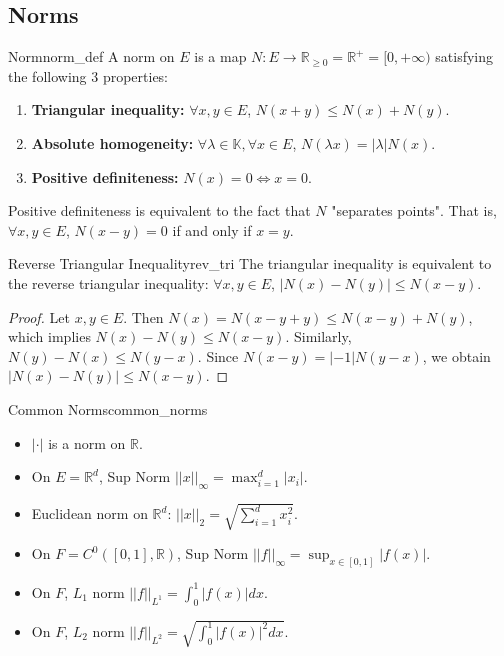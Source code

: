\documentclass[11pt, a4paper]{article}
\begin{document}
\subsection{Norms}
\begin{definition}{Norm}{norm_def}
A norm on $E$ is a map $N: E \to \mathbb{R}_{\ge 0} = \mathbb{R}^+ = [0, +\infty)$ satisfying the following 3 properties:
\begin{enumerate}
    \item \textbf{Triangular inequality:} $\forall x,y \in E$, $N(x+y) \le N(x) + N(y)$.
    \item \textbf{Absolute homogeneity:} $\forall \lambda \in \mathbb{K}, \forall x \in E$, $N(\lambda x) = |\lambda| N(x)$.
    \item \textbf{Positive definiteness:} $N(x) = 0 \Leftrightarrow x = 0$.
\end{enumerate}
\end{definition}

\begin{remark}{}{}
Positive definiteness is equivalent to the fact that $N$ "separates points". That is, $\forall x, y \in E$, $N(x-y) = 0$ if and only if $x = y$.
\end{remark}

\begin{proposition}{Reverse Triangular Inequality}{rev_tri}
The triangular inequality is equivalent to the reverse triangular inequality:
$\forall x, y \in E$, $\big|N(x) - N(y)\big| \le N(x-y)$.
\end{proposition}

\begin{proof}
Let $x, y \in E$. Then $N(x) = N(x - y + y) \le N(x-y) + N(y)$, which implies $N(x) - N(y) \le N(x-y)$.
Similarly, $N(y) - N(x) \le N(y-x)$.
Since $N(x-y) = |-1|N(y-x)$, we obtain $\big|N(x) - N(y)\big| \le N(x-y)$.
\end{proof}

\begin{example}{Common Norms}{common_norms}
\begin{itemize}
    \item $|\cdot|$ is a norm on $\mathbb{R}$.
    \item On $\displaystyle E = \mathbb{R}^d$, Sup Norm $\displaystyle ||x||_\infty = \max_{i=1}^d |x_i|$.
    \item Euclidean norm on $\displaystyle \mathbb{R}^d$: $\displaystyle||x||_2 = \sqrt{\sum_{i=1}^d x_i^2}$.
    \item On $F = C^0([0,1], \mathbb{R})$, Sup Norm $\displaystyle ||f||_\infty = \sup_{x \in [0,1]} |f(x)|$.
    \item On $F$, $L_1$ norm $\displaystyle||f||_{L^1} = \int_0^1 |f(x)| dx$.
    \item On $F$, $L_2$ norm $\displaystyle||f||_{L^2} = \sqrt{\int_0^1 |f(x)|^2 dx}$.
\end{itemize}
\end{example}
\end{document}
